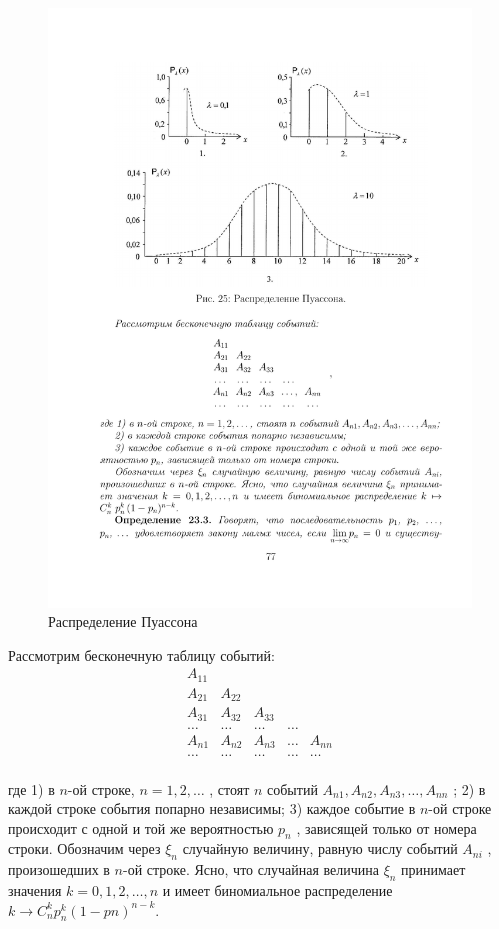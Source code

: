 \begin{figure}[H]
	\centering
	\includegraphics[]{pic/pic25}
	\caption{Распределение Пуассона}
	\label{fig25}
\end{figure} 
Рассмотрим бесконечную таблицу событий:
$$\begin{matrix} 
A_{11} &  &  &  &  \\
A_{21} & A_{22} &  &  &  \\
A_{31} & A_{32} & A_{33} &  &  \\
\ldots & \ldots & \ldots & \ldots &  \\
A_{n1} & A_{n2} & A_{n3} & \ldots & A_{nn}\\
\ldots & \ldots & \ldots & \ldots & \ldots\\   
\end{matrix}$$

где 1) в $n$-ой строке, $n = 1, 2, \ldots$ , стоят $n$ событий $A_{n1} , A_{n2} , A_{n3} , \ldots , A_{nn}$ ;
2) в каждой строке события попарно независимы;
3) каждое событие в $n$-ой строке происходит с одной и той же вероятностью $p_n$ , зависящей только от номера строки.
Обозначим через $\xi_n$ случайную величину, равную числу событий $A_{ni}$ , произошедших в $n$-ой строке. Ясно, что случайная величина $\xi_n$ принимает значения $k = 0, 1, 2, \ldots , n$ и имеет биномиальное распределение $k \to C_n^k p^k_n (1 − pn )^{n−k}.$

